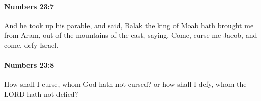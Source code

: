 		\paragraph{Numbers 23:7} %
			\label{NUMBERS-23-7}

			And he took up his parable, and said, Balak the king of Moab hath brought me from Aram, out of the mountains of the east, saying, Come, curse me Jacob, and come, defy Israel.


		\paragraph{Numbers 23:8} %
			\label{NUMBERS-23-8}

			How shall I curse, whom God hath not cursed? or how shall I defy, whom the LORD hath not defied?


